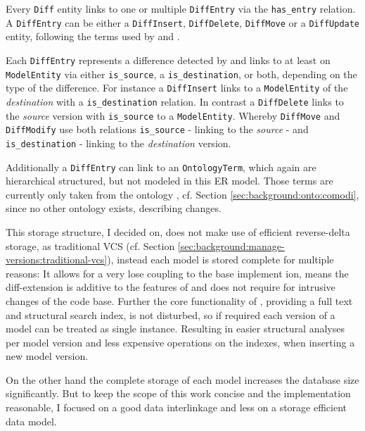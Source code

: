 Every \texttt{Diff} entity links to one or multiple \texttt{DiffEntry} via the \texttt{has\_entry} relation.  
A \texttt{DiffEntry} can be either a \texttt{DiffInsert},  \texttt{DiffDelete}, \texttt{DiffMove} or a \texttt{DiffUpdate} entity, following the terms used by \bives \citep{Scharm2015} and \comodi \citep{Scharm2016}.

Each \texttt{DiffEntry} represents a difference detected by \bives \citep{Scharm2015} and links to at least on \texttt{ModelEntity} via either \texttt{is\_source}, a \texttt{is\_destination}, or both, depending on the type of the difference.
For instance a \texttt{DiffInsert} links to a \texttt{ModelEntity} of the \emph{destination} with a \texttt{is\_destination} relation.
In contrast a \texttt{DiffDelete} links to the \emph{source} version with \texttt{is\_source} to a \texttt{ModelEntity}. Whereby \texttt{DiffMove} and \texttt{DiffModify} use both relations \texttt{is\_source} - linking to the \emph{source} - and \texttt{is\_destination} - linking to the \emph{destination} version.

Additionally a \texttt{DiffEntry} can link to an \texttt{OntologyTerm}, which again are hierarchical structured, but not modeled in this ER model. Those terms are currently only taken from the \comodi ontology \citep{Scharm2016}, cf. Section \ref{sec:background:onto:comodi}, since no other ontology exists, describing changes.


This storage structure, I decided on, does not make use of efficient reverse-delta storage, as traditional VCS (cf. Section \ref{sec:background:manage-versions:traditional-vcs}), instead each model is stored complete for multiple reasons: It allows for a very lose coupling to the base \masymos implement ion, means the diff-extension is additive to the features of \masymos and does not require for intrusive changes of the code base. Further the core functionality of \masymos, providing a full text and structural search index, is not disturbed, so if required each version of a model can be treated as single instance. Resulting in easier structural analyses per model version and less expensive operations on the indexes, when inserting a new model version.

On the other hand the complete storage of each model increases the database size significantly. But to keep the scope of this work concise and the implementation reasonable, I focused on a good data interlinkage and less on a storage efficient data model. 

